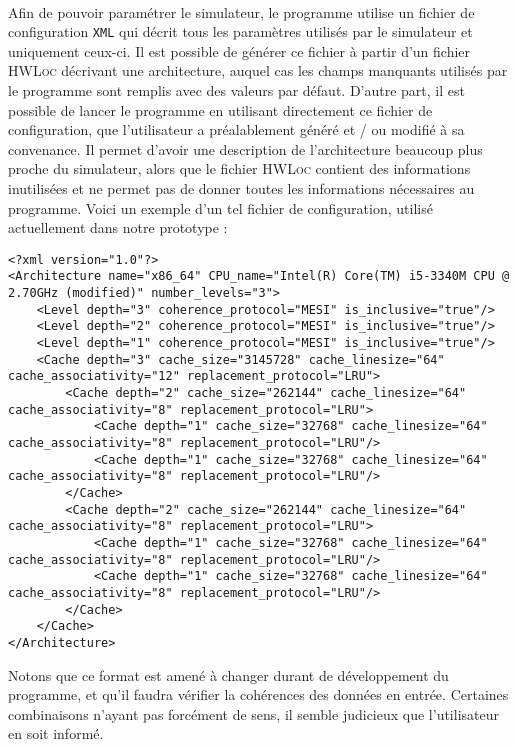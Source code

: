\paragraph{}
Afin de pouvoir paramétrer le simulateur, le programme utilise un fichier de configuration \texttt{XML} qui décrit tous les paramètres utilisés par le simulateur et uniquement ceux-ci. Il est possible de générer ce fichier à partir d'un fichier \textsc{HWLoc} décrivant une architecture, auquel cas les champs manquants utilisés par le programme sont remplis avec des valeurs par défaut. D'autre part, il est possible de lancer le programme en utilisant directement ce fichier de configuration, que l'utilisateur a préalablement généré et / ou modifié à sa convenance. Il permet d'avoir une description de l'architecture beaucoup plus proche du simulateur, alors que le fichier \textsc{HWLoc} contient des informations inutilisées et ne permet pas de donner toutes les informations nécessaires au programme. Voici un exemple d'un tel fichier de configuration, utilisé actuellement dans notre prototype :

\begin{lstlisting}
<?xml version="1.0"?>
<Architecture name="x86_64" CPU_name="Intel(R) Core(TM) i5-3340M CPU @ 2.70GHz (modified)" number_levels="3">
    <Level depth="3" coherence_protocol="MESI" is_inclusive="true"/>
    <Level depth="2" coherence_protocol="MESI" is_inclusive="true"/>
    <Level depth="1" coherence_protocol="MESI" is_inclusive="true"/>
    <Cache depth="3" cache_size="3145728" cache_linesize="64" cache_associativity="12" replacement_protocol="LRU">
        <Cache depth="2" cache_size="262144" cache_linesize="64" cache_associativity="8" replacement_protocol="LRU">
            <Cache depth="1" cache_size="32768" cache_linesize="64" cache_associativity="8" replacement_protocol="LRU"/>
            <Cache depth="1" cache_size="32768" cache_linesize="64" cache_associativity="8" replacement_protocol="LRU"/>
        </Cache>
        <Cache depth="2" cache_size="262144" cache_linesize="64" cache_associativity="8" replacement_protocol="LRU">
            <Cache depth="1" cache_size="32768" cache_linesize="64" cache_associativity="8" replacement_protocol="LRU"/>
            <Cache depth="1" cache_size="32768" cache_linesize="64" cache_associativity="8" replacement_protocol="LRU"/>
        </Cache>
    </Cache>
</Architecture>
\end{lstlisting}

Notons que ce format est amené à changer durant de développement du programme, et qu'il faudra vérifier la cohérences des données en entrée. Certaines combinaisons n'ayant pas forcément de sens, il semble judicieux que l'utilisateur en soit informé.
